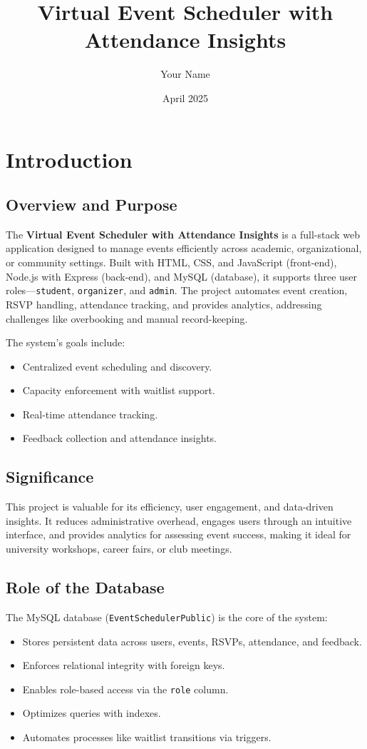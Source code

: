 \documentclass[12pt]{article}
\title{Virtual Event Scheduler with Attendance Insights}
\author{Your Name}
\date{April 2025}
\begin{document}
\maketitle

\section{Introduction}
\subsection{Overview and Purpose}
The \textbf{Virtual Event Scheduler with Attendance Insights} is a full-stack web application designed to manage events efficiently across academic, organizational, or community settings. Built with HTML, CSS, and JavaScript (front-end), Node.js with Express (back-end), and MySQL (database), it supports three user roles—\texttt{student}, \texttt{organizer}, and \texttt{admin}. The project automates event creation, RSVP handling, attendance tracking, and provides analytics, addressing challenges like overbooking and manual record-keeping.

The system’s goals include:
\begin{itemize}
    \item Centralized event scheduling and discovery.
    \item Capacity enforcement with waitlist support.
    \item Real-time attendance tracking.
    \item Feedback collection and attendance insights.
\end{itemize}

\subsection{Significance}
This project is valuable for its efficiency, user engagement, and data-driven insights. It reduces administrative overhead, engages users through an intuitive interface, and provides analytics for assessing event success, making it ideal for university workshops, career fairs, or club meetings.

\subsection{Role of the Database}
The MySQL database (\texttt{EventSchedulerPublic}) is the core of the system:
\begin{itemize}
    \item Stores persistent data across users, events, RSVPs, attendance, and feedback.
    \item Enforces relational integrity with foreign keys.
    \item Enables role-based access via the \texttt{role} column.
    \item Optimizes queries with indexes.
    \item Automates processes like waitlist transitions via triggers.
\end{itemize}
\end{document}
